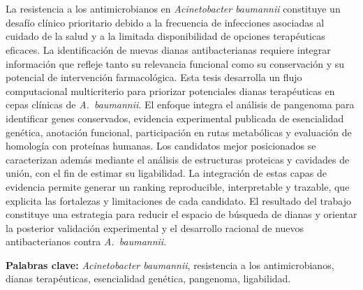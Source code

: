 \chapter*{\runtitulo}

\noindent La resistencia a los antimicrobianos en \textit{Acinetobacter baumannii} constituye un desafío clínico prioritario debido a la frecuencia de infecciones asociadas al cuidado de la salud y a la limitada disponibilidad de opciones terapéuticas eficaces. La identificación de nuevas dianas antibacterianas requiere integrar información que refleje tanto su relevancia funcional como su conservación y su potencial de intervención farmacológica. Esta tesis desarrolla un flujo computacional multicriterio para priorizar potenciales dianas terapéuticas en cepas clínicas de \textit{A.~baumannii}. El enfoque integra el análisis de pangenoma para identificar genes conservados, evidencia experimental publicada de esencialidad genética, anotación funcional, participación en rutas metabólicas y evaluación de homología con proteínas humanas. Los candidatos mejor posicionados se caracterizan además mediante el análisis de estructuras proteicas y cavidades de unión, con el fin de estimar su ligabilidad. La integración de estas capas de evidencia permite generar un ranking reproducible, interpretable y trazable, que explicita las fortalezas y limitaciones de cada candidato. El resultado del trabajo constituye una estrategia para reducir el espacio de búsqueda de dianas y orientar la posterior validación experimental y el desarrollo racional de nuevos antibacterianos contra \textit{A.~baumannii}.

\bigskip

\noindent\textbf{Palabras clave:} \textit{Acinetobacter baumannii}, resistencia a los antimicrobianos, dianas terapéuticas, esencialidad genética, pangenoma, ligabilidad.
